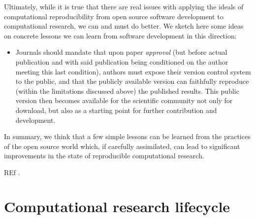 \documentclass[ChapterTOCs,krantz2]{krantz} %
\begin{document}
Ultimately, while it is true that there are real issues with applying
the ideals of computational reproducibility from open source software
development to computational research, we can and must do better.
We sketch here some ideas on concrete lessons we can learn from software
development in this direction:
\begin{itemize}
\item Journals should mandate that upon paper \emph{approval} (but before
actual publication and with said publication being conditioned on
the author meeting this last condition), authors must expose their
version control system to the public, and that the publicly available
version can faithfully reproduce (within the limitations discussed
above) the published results. This public version then becomes available
for the scientific community not only for download, but also as a
starting point for further contribution and development.
\end{itemize}
In summary, we think that a few simple lessons can be learned from
the practices of the open source world which, if carefully assimilated,
can lead to significant improvements in the state of reproducible
computational research. 

REf \cite{10.3389/fncom.2012.00018}.

\section{\label{sec:lifecycle}Computational research lifecycle}
\end{document}
